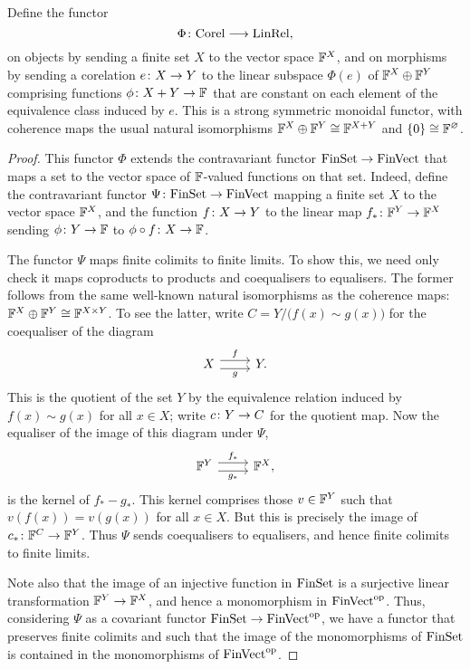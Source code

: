 \begin{proposition}
  Define the functor 
  \[ 
    \Phi{\colon} \mathrm{Corel} \longrightarrow \mathrm{LinRel}, 
  \] 
  on objects by sending a finite set $X$ to the vector space ${\mathbb F}^X$, and on
  morphisms by sending a corelation $e{\colon} X \to Y$ to the linear subspace
  $\Phi(e)$ of ${\mathbb F}^X \oplus {\mathbb F}^Y$ comprising functions $\phi{\colon} X+Y \to {\mathbb F}$
  that are constant on each element of the equivalence class induced by
  $e$.  This is a strong symmetric monoidal functor, with coherence maps
  the usual natural isomorphisms ${\mathbb F}^X \oplus {\mathbb F}^Y \cong {\mathbb F}^{X + Y}$ and
  $\{0\} \cong {\mathbb F}^\varnothing$. 
\end{proposition}
\begin{proof}
This functor $\Phi$ extends the contravariant functor $\mathrm{FinSet} \to \mathrm{FinVect}$
that maps a set to the vector space of ${\mathbb F}$-valued functions on that set.
Indeed, define the contravariant functor $\Psi{\colon} \mathrm{FinSet} \to \mathrm{FinVect}$
mapping a finite set $X$ to the vector space ${\mathbb F}^X$, and the function $f{\colon} X
\to Y$ to the linear map $f_\ast{\colon} {\mathbb F}^Y \to {\mathbb F}^X$ sending $\phi{\colon} Y \to {\mathbb F}$
to $\phi \circ f{\colon} X \to {\mathbb F}$.

The functor $\Psi$ maps finite colimits to finite limits. To show this, we need only
check it maps coproducts to products and coequalisers to equalisers. The former
follows from the same well-known natural isomorphisms as the coherence maps:
${\mathbb F}^X \oplus {\mathbb F}^Y \cong {\mathbb F}^{X\times Y}$. To see the latter, write $C = Y/\big(f(x)
\sim g(x)\big)$ for the coequaliser of the diagram 
\[
\begin{tikzcd}
X \ar[r,shift left=.75ex,"f"]
  \ar[r,shift right=.75ex,swap,"g"]
&
Y.
\end{tikzcd}
\]
This is the quotient of the set $Y$ by the equivalence relation induced by $f(x)
\sim g(x)$ for all $x \in X$; write $c{\colon} Y \to C$ for the quotient map.  Now
the equaliser of the image of this diagram under $\Psi$,
\[
\begin{tikzcd}
\F^Y \ar[r,shift left=.75ex,"f_\ast"]
  \ar[r,shift right=.75ex,swap,"g_\ast"]
&
\F^X,
\end{tikzcd}
\]
is the kernel of $f_\ast-g_\ast$. This kernel comprises those $v \in {\mathbb F}^Y$ such
that $v(f(x)) = v(g(x))$ for all $x \in X$. But this is precisely the image of
$c_\ast{\colon} {\mathbb F}^C \to {\mathbb F}^Y$. Thus $\Psi$ sends coequalisers to equalisers, and
hence finite colimits to finite limits.

Note also that the image of an injective function in $\mathrm{FinSet}$ is a
surjective linear transformation ${\mathbb F}^Y \to {\mathbb F}^X$, and hence a monomorphism in
$\mathrm{FinVect}^{\mathrm{op}}$. Thus, considering $\Psi$ as a covariant functor $\mathrm{FinSet} \to
\mathrm{FinVect}^{\mathrm{op}}$, we have a functor that preserves finite colimits and such that
the image of the monomorphisms of $\mathrm{FinSet}$ is contained in the monomorphisms of
$\mathrm{FinVect}^{\mathrm{op}}$.


\end{proof}
